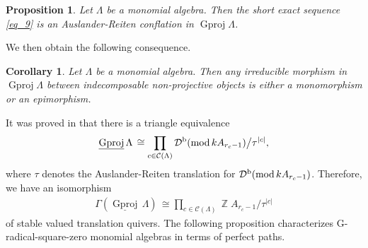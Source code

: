 \documentclass[12pt]{amsart}
\numberwithin{equation}{subsection}
\theoremstyle{plain}
\newtheorem{proposition}[theorem]{Proposition}
\newtheorem{corollary}[theorem]{Corollary}
\theoremstyle{definition}
\renewcommand{\mod}{\mathrm{mod}\,}
\newcommand{\Gproj}{\operatorname{Gproj}}
\newcommand{\sGproj}{\underline{\operatorname{Gproj}}\,}
\newcommand{\Z}{\operatorname{\mathbb{Z}}\nolimits}
\renewcommand{\L}{\Lambda}
\newcommand{\G}{\Gamma}
\newcommand{\D}{\mathcal{D}}
\newcommand{\C}{\mathcal{C}}
\begin{document}
\begin{proposition}
Let $\L$ be a monomial algebra.
Then the short exact sequence \eqref{eq_9} is an Auslander-Reiten conflation in $\Gproj\L$. 
\end{proposition}




We then obtain the following consequence.




\begin{corollary}\label{claim_38}
Let $\L$ be a monomial algebra.
Then any irreducible morphism in $\Gproj\L$ between indecomposable non-projective objects is either a monomorphism or an epimorphism.
\end{corollary}



It was proved in \cite[Theorem 4.3]{Honma-Usui_2025} that there is a triangle equivalence
\begin{align}
 \sGproj\L\, \cong \prod_{c \in \C(\L)} \D^{\rm b}\!\left(\mod k A_{r_c -1}\right)\!\big/\tau^{|c|},   
\end{align}
where 
$\tau$ denotes the Auslander-Reiten translation for $\D^{\rm b}\!\left(\mod k A_{r_c -1}\right)$. 
Therefore, we have an isomorphism   
\begin{align}\label{monomial_eq_2}
 \G(\sGproj\L)\, \cong \prod_{c \in \C(\L)} \Z\!A_{r_c -1}\big/\tau^{|c|} 
\end{align}
of stable valued translation quivers.
The following proposition characterizes G-radical-square-zero monomial algebras in terms of perfect paths.
\end{document}
